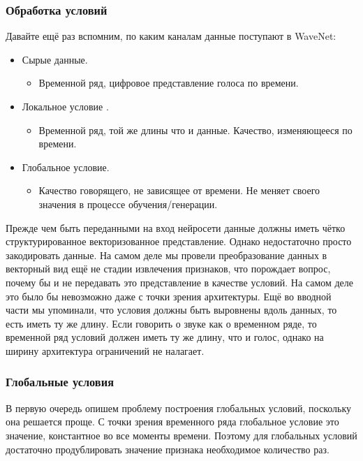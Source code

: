 \documentclass[../diploma.tex]{subfiles}
\begin{document}
    
\newpage    

\subsubsection{Обработка условий}

Давайте ещё  раз вспомним, по каким каналам данные поступают в WaveNet:

\begin{itemize}
    \item Сырые данные.
    \begin{itemize}
        \item Временной ряд, цифровое представление голоса по времени.
    \end{itemize}
    \item Локальное условие .
    \begin{itemize}
        \item Временной ряд, той же длины что и данные. Качество, изменяющееся по времени.
    \end{itemize}
    \item Глобальное условие.
    \begin{itemize}
        \item Качество говорящего, не зависящее от времени. Не меняет своего значения в процессе обучения/генерации.
    \end{itemize}
\end{itemize}


Прежде чем быть переданными на вход нейросети данные должны иметь чётко структурированное векторизованное представление. Однако недостаточно просто закодировать данные. На самом деле мы провели преобразование данных в векторный вид ещё не стадии извлечения признаков, что порождает вопрос, почему бы и не передавать это представление в качестве условий.
На самом деле это было бы невозможно даже с точки зрения архитектуры. Ещё во вводной части мы упоминали, что условия должны быть выровнены вдоль данных, то есть иметь ту же длину. Если говорить о звуке как о временном ряде, то временной ряд условий должен иметь ту же длину, что и голос, однако на ширину архитектура ограничений не налагает.

\subsubsection{Глобальные условия}

В первую очередь опишем проблему построения глобальных условий, поскольку она решается проще. С точки зрения временного ряда глобальное условие это значение, константное во все моменты времени. Поэтому для глобальных условий достаточно продублировать значение признака необходимое количество раз.
\end{document}
